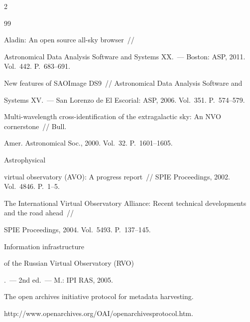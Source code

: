\begin{multicols}{2}
{{\begin{thebibliography}{99}

Aladin: An open source all-sky browser~// 

Astronomical Data Analysis Software and Systems XX.~--- Boston: ASP, 2011. Vol.~442. P.~683--691. 



New features of SAOImage DS9~// Astronomical Data Analysis Software and 

Systems XV.~--- San Lorenzo de El Escorial: ASP, 2006. Vol.~351. P.~574--579. 



 Multi-wavelength cross-identification of the extragalactic sky: An NVO cornerstone~// Bull. 

Amer. Astronomical Soc., 2000. Vol.~32. P.~1601--1605.



Astrophysical 

virtual observatory (AVO): A progress report~// SPIE Proceedings, 2002. Vol.~4846. P.~1--5.



The International Virtual Observatory Alliance: Recent technical developments and the road ahead~// 

SPIE Proceedings, 2004. Vol.~5493. P.~137--145.



{Information infrastructure 

of the Russian Virtual Observatory (RVO)}.~--- 2nd ed.~--- M.: IPI RAS, 2005.


The open archives initiative protocol for metadata harvesting. 

{\sf http://www.openarchives.org/OAI/\linebreak openarchivesprotocol.htm}.


\end{thebibliography}}}
\end{multicols}
